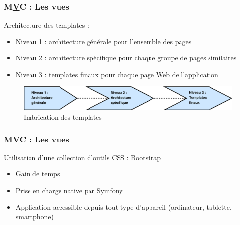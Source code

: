 \begin{frame}
\frametitle{M\underline{V}C : Les vues}
Architecture des templates :
\begin{itemize}
\item Niveau 1 : architecture générale pour l'ensemble des pages
\item Niveau 2 : architecture spécifique pour chaque groupe de pages similaires
\item Niveau 3 : templates finaux pour chaque page Web de l'application
\end{itemize}
\begin{figure}[!h]
	\begin{center}
	\includegraphics[scale=0.3]{images/archiTemplates}
	\caption{Imbrication des templates}
	\end{center}
\end{figure}
\end{frame}

\begin{frame}
\frametitle{M\underline{V}C : Les vues}
Utilisation d'une collection d'outils CSS : Bootstrap
\begin{itemize}
\item Gain de temps
\item Prise en charge native par Symfony
\item Application accessible depuis tout type d'appareil (ordinateur, tablette, smartphone)
\end{itemize}
\end{frame}

